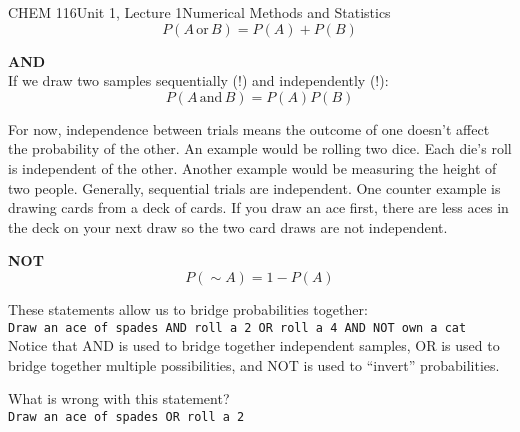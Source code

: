 \documentclass{article}
\begin{document}
\begin{tdoc}{CHEM 116}{Unit 1, Lecture 1}{Numerical Methods and Statistics}
\begin{equation}
P(A\,\textrm{or}\,B) = P(A) + P(B)
\end{equation}
\vspace{0.2cm}

{\bf AND}\vspace{0.5cm}\\

If we draw two samples sequentially (!) and independently (!):
\begin{equation}
P(A\,\textrm{and}\,B) = P(A)P(B)
\end{equation}

For now, independence between trials means the outcome of one doesn't
affect the probability of the other. An example would be rolling two
dice. Each die's roll is independent of the other. Another example
would be measuring the height of two people. Generally, sequential
trials are independent. One counter example is drawing cards from a
deck of cards. If you draw an ace first, there are less aces in the
deck on your next draw so the two card draws are not independent.

\vspace{0.2cm}

{\bf NOT}\vspace{0.5cm}\\

\begin{equation}
P(\sim A) = 1 - P(A)
\end{equation}
\vspace{0.2cm}

These statements allow us to bridge probabilities together:\vspace{0.2cm}\\

\texttt{Draw an ace of spades AND roll a 2 OR roll a 4 AND NOT own a cat}\\

\vspace{0.2cm}Notice that AND is used to bridge together independent samples, OR is
used to bridge together multiple possibilities, and NOT is used to
``invert'' probabilities.\vspace{0.2cm}

What is wrong with this statement? \vspace{0.2cm}\\

\texttt{Draw an ace of spades OR roll a 2}\vspace{0.2cm}\\


\end{tdoc}
\end{document}
